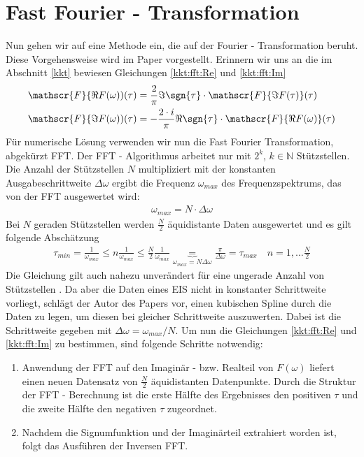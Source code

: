 \section{Fast Fourier - Transformation}
Nun gehen wir auf eine Methode ein, die auf der Fourier - Transformation beruht. Diese Vorgehensweise wird im Paper \cite{Bruzzoni2002} vorgestellt. Erinnern wir uns an die im Abschnitt \ref{kkt} bewiesen Gleichungen \ref{kkt:fft:Re} und \ref{kkt:fft:Im}
\begin{align}
	\mathscr{F}\{\Re{F(\omega)})(\tau) &= \frac{2}{\pi} \Im{ \sgn{\tau} \cdot  \mathscr{F}\{\Im{F(\tau)}\}(\tau)}\label{kkt:fft:Re}\\
	\mathscr{F}\{\Im{F(\omega)})(\tau) &= - \frac{2 \cdot i}{\pi} \Re{ \sgn{\tau} \cdot  \mathscr{F}\{\Re{F(\omega)}\}(\tau)}\label{kkt:fft:Im}
\end{align}
Für numerische Lösung verwenden wir nun die Fast Fourier Transformation, abgekürzt FFT. Der FFT - Algorithmus arbeitet nur mit $2^k$, $k \in \mathbb{N}$ Stützstellen. Die Anzahl der Stützstellen $N$ multipliziert mit der konstanten Ausgabeschrittweite $\Delta \omega$ ergibt die Frequenz $\omega_{max}$ des Frequenzspektrums, das von der FFT ausgewertet wird:
\begin{align}
	\omega_{max}=  N \cdot \Delta \omega 
\end{align}
Bei $N$ geraden Stützstellen werden $\frac{N}{2}$ äquidistante Daten ausgewertet und es gilt folgende Abschätzung
\begin{align}
	\tau_{min} = \frac{1}{\omega_{max}} \leq n \frac{1}{\omega_{max}} \leq \frac{N}{2} \frac{1}{\omega_{max}} \underbrace{=}_{\omega_{max} = N \Delta \omega}  \frac{\pi}{\Delta \omega} = \tau_{max} \quad n = 1, \hdots \frac{N}{2}
\end{align}
Die Gleichung gilt auch nahezu unverändert für eine ungerade Anzahl von Stützstellen \cite{Kuypers2008}.
Da aber die Daten eines EIS nicht in konstanter Schrittweite vorliegt, schlägt der Autor des Papers \cite{Bruzzoni2002} vor, einen kubischen Spline durch die Daten zu legen, um diesen bei gleicher Schrittweite auszuwerten. Dabei ist die Schrittweite gegeben mit 
$\Delta \omega =  \omega_{max}/N$.
Um nun die Gleichungen \ref{kkt:fft:Re} und \ref{kkt:fft:Im} zu bestimmen, sind folgende Schritte notwendig:
\begin{enumerate}[label=\roman*]
\item Anwendung der FFT auf den Imaginär - bzw. Realteil von $F(\omega)$ liefert einen neuen Datensatz von $\frac{N}{2}$ äquidistanten Datenpunkte. Durch die Struktur der FFT - Berechnung ist die erste Hälfte des Ergebnisses den positiven $\tau$ und die zweite Hälfte den negativen $\tau$ zugeordnet.
\item  Nachdem die Signumfunktion und der Imaginärteil extrahiert worden ist, folgt das Ausführen der Inversen FFT.  
\end{enumerate}
